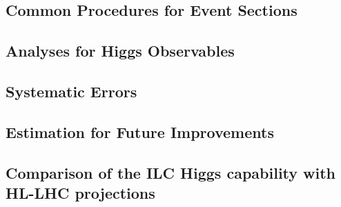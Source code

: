 


\subsection{Common Procedures for Event Sections}

\label{subsec:higgs_common}

\subsection{Analyses for Higgs Observables}


% 

% 

\subsection{Systematic Errors}



\subsection{Estimation for Future Improvements}



\subsection{Comparison of the ILC Higgs capability with 
HL-LHC projections}
\label{subsec:higgs_lhcilc}



